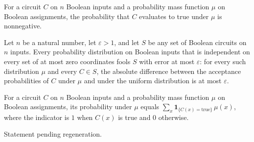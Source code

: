 \begin{lemma}
\label{Circuit.prob_nonneg}
\leanok
{}
For a circuit $C$ on $n$ Boolean inputs and a probability mass function $\mu$ on Boolean
assignments, the probability that $C$ evaluates to true under $\mu$ is nonnegative.
\end{lemma}

\begin{lemma}
\label{Fools_zero_of_eps_gt_one}
\leanok
{}
Let $n$ be a natural number, let $\varepsilon>1$, and let $S$ be any set of Boolean
circuits on $n$ inputs. Every probability distribution on Boolean inputs that is
independent on every set of at most zero coordinates fools $S$ with error at most
$\varepsilon$: for every such distribution $\mu$ and every $C\in S$, the absolute
difference between the acceptance probabilities of $C$ under $\mu$ and under the uniform
distribution is at most $\varepsilon$.
\end{lemma}

\begin{lemma}
\label{Circuit.prob_eq_sum}
\leanok
{}
For a circuit $C$ on $n$ Boolean inputs and a probability mass function $\mu$ on Boolean
assignments, its probability under $\mu$ equals $\sum_x
\mathbf{1}_{\{C(x)=\mathrm{true}\}}\,\mu(x)$, where the indicator is $1$ when $C(x)$ is
true and $0$ otherwise.
\end{lemma}

\begin{theorem}
\label{Braverman_Theorem}
\leanok
{}
Statement pending regeneration.
\end{theorem}
